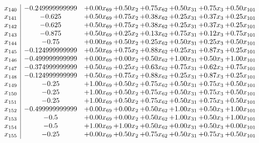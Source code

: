\documentclass[8pt]{article}
\begin{document}
\[\begin{array}{c| c c@{\hskip 2pt} c@{\hskip 2pt} c@{\hskip 2pt} c@{\hskip 2pt} c@{\hskip 2pt} c@{\hskip 2pt} }
 x_{140}   &  -0.249999999999 & +  0.00 x_{69} & +  0.50 x_{2} & +  0.75 x_{62} & +  0.50 x_{31} & +  0.75 x_{3} & +  0.50 x_{101}\\
 x_{141}   &  -0.625 & +  0.50 x_{69} & +  0.75 x_{2} & +  0.38 x_{62} & +  0.25 x_{31} & +  0.37 x_{3} & +  0.25 x_{101}\\
 x_{142}   &  -0.625 & +  0.50 x_{69} & +  0.75 x_{2} & +  0.38 x_{62} & +  0.25 x_{31} & +  0.37 x_{3} & +  0.25 x_{101}\\
 x_{143}   &  -0.875 & +  0.50 x_{69} & +  0.25 x_{2} & +  0.13 x_{62} & +  0.75 x_{31} & +  0.12 x_{3} & +  0.75 x_{101}\\
 x_{144}   &  -0.75 & +  0.00 x_{69} & +  0.50 x_{2} & +  0.25 x_{62} & +  0.50 x_{31} & +  0.25 x_{3} & +  0.50 x_{101}\\
 x_{145}   &  -0.124999999999 & +  0.50 x_{69} & +  0.75 x_{2} & +  0.88 x_{62} & +  0.25 x_{31} & +  0.87 x_{3} & +  0.25 x_{101}\\
 x_{146}   &  -0.499999999999 & +  0.00 x_{69} & +  0.00 x_{2} & +  0.50 x_{62} & +  1.00 x_{31} & +  0.50 x_{3} & +  1.00 x_{101}\\
 x_{147}   &  -0.374999999999 & +  0.50 x_{69} & +  0.25 x_{2} & +  0.63 x_{62} & +  0.75 x_{31} & +  0.62 x_{3} & +  0.75 x_{101}\\
 x_{148}   &  -0.124999999999 & +  0.50 x_{69} & +  0.75 x_{2} & +  0.88 x_{62} & +  0.25 x_{31} & +  0.87 x_{3} & +  0.25 x_{101}\\
 x_{149}   &  -0.25 & +  1.00 x_{69} & +  0.50 x_{2} & +  0.75 x_{62} & +  0.50 x_{31} & +  0.75 x_{3} & +  0.50 x_{101}\\
 x_{150}   &  -0.25 & +  1.00 x_{69} & +  0.50 x_{2} & +  0.75 x_{62} & +  0.50 x_{31} & +  0.75 x_{3} & +  0.50 x_{101}\\
 x_{151}   &  -0.25 & +  1.00 x_{69} & +  0.50 x_{2} & +  0.75 x_{62} & +  0.50 x_{31} & +  0.75 x_{3} & +  0.50 x_{101}\\
 x_{152}   &  -0.499999999999 & +  0.00 x_{69} & +  0.00 x_{2} & +  0.50 x_{62} & +  1.00 x_{31} & +  0.50 x_{3} & +  1.00 x_{101}\\
 x_{153}   &  -0.5 & +  0.00 x_{69} & +  0.00 x_{2} & +  0.50 x_{62} & +  1.00 x_{31} & +  0.50 x_{3} & +  1.00 x_{101}\\
 x_{154}   &  -0.5 & +  1.00 x_{69} & +  1.00 x_{2} & +  0.50 x_{62} & +  0.00 x_{31} & +  0.50 x_{3} & +  0.00 x_{101}\\
 x_{155}   &  -0.25 & +  0.00 x_{69} & +  0.50 x_{2} & +  0.75 x_{62} & +  0.50 x_{31} & +  0.75 x_{3} & +  0.50 x_{101}\\

\end{array}\]
\end{document}
